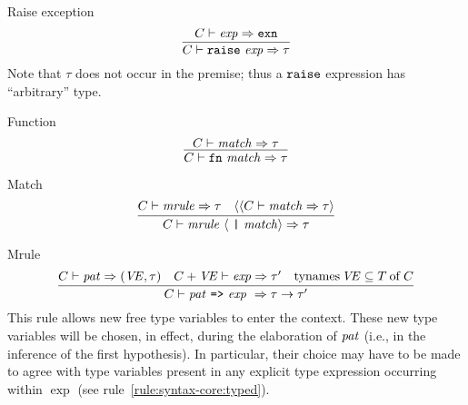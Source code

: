 \begin{sml-rule}{Raise exception}
\begin{equation}\label{rule:syntax-core:raise-exception}
\vcenter{\infer{\C\ts\raisexp\ra\tau}{\C\ts\exp\ra\EXCN}}
\end{equation}
Note that $\tau$ does not occur in the premise; thus a ${\tt raise}$
expression has ``arbitrary'' type.
\end{sml-rule}

\begin{sml-rule}{Function}
\begin{equation}\label{rule:syntax-core:function}
\vcenter{\infer{\C\ts\fnexp\ra\tau}{\C\ts\match\ra\tau}}
\end{equation}
\end{sml-rule}


\begin{sml-rule}{Match}
\begin{equation}\label{rule:syntax-core:match}
  \vcenter{\infer{\C\ts\longmatch\ra\tau}
    {\C\ts\mrule\ra\tau
      & \optional{\langle\C\ts\match\ra\tau}}}
\end{equation}
\end{sml-rule}


\begin{sml-rule}{Mrule}
\begin{equation}\label{rule:syntax-core:mrule}
  \vcenter{\infer{\C\ts\longmrule\ \ra\tau\rightarrow\tau'}
    {\C\ts\pat\ra(\VE,\tau)
      & \C+\VE\ts\exp\ra\tau'
      & \TyNamesFcn\VE\subseteq\of{\T}{\C}}}
\end{equation}
This rule allows new free type variables to enter
the context. These new type variables will be chosen, in effect, during
the elaboration of $\textit{pat\/}$ (i.e., in the inference of the first
hypothesis). In particular, their choice may have to be made to
agree with type variables present in any explicit type expression
occurring within $\exp$ (see rule~\ref{rule:syntax-core:typed}).
\end{sml-rule}



